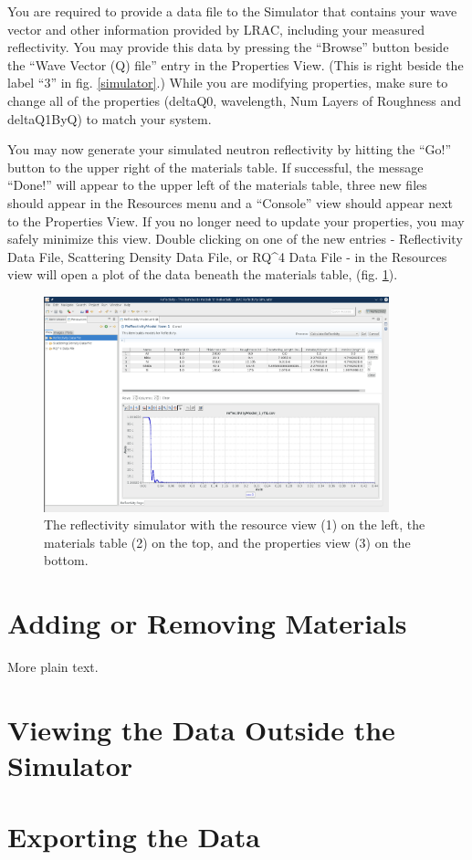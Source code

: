You are required to provide a data file to the Simulator that contains your wave
vector and other information provided by LRAC, including your measured
reflectivity. You may provide this data by pressing the ``Browse'' button beside
the ``Wave Vector (Q) file'' entry in the Properties View. (This is right beside
the label ``3'' in fig. \ref{simulator}.) While you are modifying properties,
make sure to change all of the properties (deltaQ0, wavelength, Num Layers of
Roughness and deltaQ1ByQ) to match your system.

You may now generate your simulated neutron reflectivity by hitting the ``Go!''
button to the upper right of the materials table. If successful, the message
``Done!'' will appear to the upper left of the materials table, three new files
should appear in the Resources menu and a ``Console'' view should appear next to
the Properties View. If you no longer need to update your properties, you may
safely minimize this view. Double clicking on one of the new entries -
Reflectivity Data File, Scattering Density Data File, or RQ^4 Data File - in the
Resources view will open a plot of the data beneath the materials table, (fig.
\ref{simulatorPost}).

\begin{figure}[!h]
\centering
\includegraphics[width=10cm]{images/simulatorProcessed.png}
\caption{The reflectivity simulator with the resource view (1) on the left, the
materials table (2) on the top, and the properties view (3) on the bottom.}
\label{simulatorPost}
\end{figure}


\section{Adding or Removing Materials}
\label{modifyMaterials}

More plain text.

\section{Viewing the Data Outside the Simulator}
\label{viz}

\section{Exporting the Data}
\label{export}
